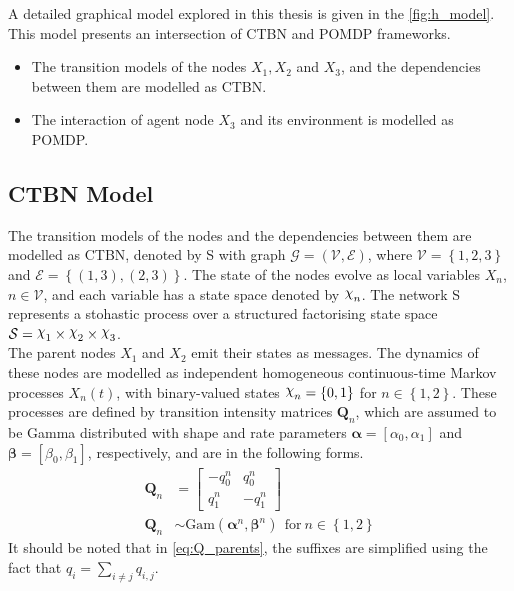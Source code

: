 A detailed graphical model explored in this thesis is given in the \cref{fig:h_model}. This model presents an intersection of CTBN and POMDP frameworks. 
\begin{itemize}
	\item The transition models of the nodes $ X_1, X_2$ and $ X_3 $, and the dependencies between them are modelled as CTBN.
	\item The interaction of agent node $ X_3 $ and its environment is modelled as POMDP.
\end{itemize}

\subsection{CTBN Model}
\label{sec:exp_ctbn_model}
The transition models of the nodes and the dependencies between them are modelled as CTBN, denoted by S with graph $ \mathcal{G} = \left( \mathcal{V}, \mathcal{E}\right) $, where $ \mathcal{V} = \left\lbrace 1, 2, 3 \right\rbrace $ and $ \mathcal{E} = \left\lbrace (1, 3), (2, 3)\right\rbrace  $. The state of the nodes evolve as local variables $ X_n $, $ n\in \mathcal{V} $, and each variable has a state space denoted by $ \rchi_n $. The network S represents a stohastic process over a structured factorising state space $ \mathcal{S} = \rchi_1 \times \rchi_2 \times \rchi_3 $.\\
The parent nodes $X_{1}$ and $ X_{2} $ emit their states as messages. The dynamics  of these nodes are modelled as independent homogeneous continuous-time Markov processes $X_{n}(t)$, with binary-valued states $ \rchi_{n} = \left\lbrace 0, 1 \right\rbrace  $ for $ n \in \left\lbrace 1,2 \right\rbrace $. These processes are defined by transition intensity matrices $ \textbf{Q}_{n} $, which are assumed to be Gamma distributed with shape and rate parameters $ \symbf{\alpha} = [\alpha_0, \alpha_1] $ and $ \symbf{\beta} = [\beta_0, \beta_1] $, respectively, and are in the following forms.
\begin{align}
\textbf{Q}_n &= 
\begin{bmatrix}
-q^n_{0} & q^n_{0} \\
q^n_{1} &  -q^n_{1}
\end{bmatrix}
\label{eq:Q_parents}\\
\textbf{Q}_{n} &\sim \mathrm{Gam}(\symbf{\alpha}^n, \symbf{\beta}^n)\ \ \text{for}\ n \in \left\lbrace 1,2\right\rbrace \label{eq:gamma_priors}
\end{align}
It should be noted that in \autoref{eq:Q_parents}, the suffixes are simplified using the fact that $ q_{i} = \sum_{i \neq j} q_{i,j}$.\\
